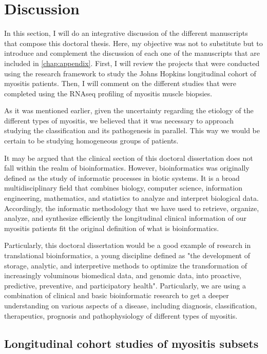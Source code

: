 \chapter{Discussion}

In this section, I will do an integrative discussion of the different manuscripts that compose this doctoral thesis. Here, my objective was not to substitute but to introduce and complement the discussion of each one of the manuscripts that are included in \autoref{chap:appendix}. First, I will review the projects that were conducted using the research framework to study the Johns Hopkins longitudinal cohort of myositis patients. Then, I will comment on the different studies that were completed using the RNAseq profiling of myositis muscle biopsies.

As it was mentioned earlier, given the uncertainty regarding the etiology of the different types of myositis, we believed that it was necessary to approach studying the classification and its pathogenesis in parallel. This way we would be certain to be studying homogeneous groups of patients.

It may be argued that the clinical section of this doctoral dissertation does not fall within the realm of bioinformatics. However, bioinformatics was originally defined as the study of informatic processes in biotic systems.\cite{Hogeweg1978} It is a broad multidisciplinary field that combines biology, computer science, information engineering, mathematics, and statistics to analyze and interpret biological data. Accordingly, the informatic methodology that we have used to retrieve, organize, analyze, and synthesize efficiently the longitudinal clinical information of our myositis patients fit the original definition of what is bioinformatics.

Particularly, this doctoral dissertation would be a good example of research in translational bioinformatics, a young discipline defined as "the development of storage, analytic, and interpretive methods to optimize the transformation of increasingly voluminous biomedical data, and genomic data, into proactive, predictive, preventive, and participatory health".\cite{Tenenbaum2016} Particularly, we are using a combination of clinical and basic bioinformatic research to get a deeper understanding on various aspects of a disease, including diagnosis, classification, therapeutics, prognosis and pathophysiology of different types of myositis.

\section{Longitudinal cohort studies of myositis subsets}

